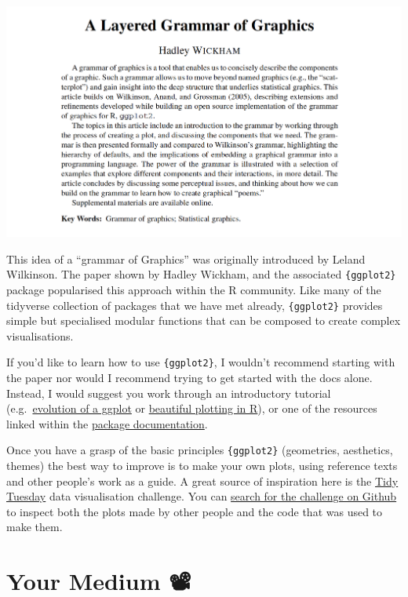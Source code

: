 \documentclass[
  letterpaper,
  DIV=11,
  numbers=noendperiod]{scrreprt}
\begin{document}
\includegraphics{images/303-data-visualisation/grammar-of-graphics-abstract.png}

This idea of a ``grammar of Graphics'' was originally introduced by
Leland Wilkinson. The paper shown by Hadley Wickham, and the associated
\texttt{\{ggplot2\}} package popularised this approach within the R
community. Like many of the tidyverse collection of packages that we
have met already, \texttt{\{ggplot2\}} provides simple but specialised
modular functions that can be composed to create complex visualisations.

If you'd like to learn how to use \texttt{\{ggplot2\}}, I wouldn't
recommend starting with the paper nor would I recommend trying to get
started with the docs alone. Instead, I would suggest you work through
an introductory tutorial
(e.g.~\href{https://www.cedricscherer.com/2019/05/17/the-evolution-of-a-ggplot/}{evolution
of a ggplot} or
\href{https://www.cedricscherer.com/2019/08/05/a-ggplot2-tutorial-for-beautiful-plotting-in-r/}{beautiful
plotting in R}), or one of the resources linked within the
\href{https://ggplot2.tidyverse.org/\#learning-ggplot2}{package
documentation}.

Once you have a grasp of the basic principles \texttt{\{ggplot2\}}
(geometries, aesthetics, themes) the best way to improve is to make your
own plots, using reference texts and other people's work as a guide. A
great source of inspiration here is the
\href{https://github.com/rfordatascience/tidytuesday}{Tidy Tuesday} data
visualisation challenge. You can
\href{https://github.com/search?q=tidy\%20tuesday&type=repositories}{search
for the challenge on Github} to inspect both the plots made by other
people and the code that was used to make them.

\section{Your Medium 📽}\label{your-medium}
\end{document}
